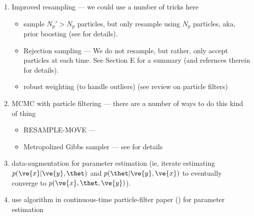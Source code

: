 \documentclass[12pt]{article}
\newcommand{\x}{\ve{x}}
\newcommand{\y}{\ve{y}}
\begin{document}
\begin{enumerate}
\item Improved resampling --- we could use a number of tricks here
\begin{itemize}
\item  sample $N_p' > N_p$ particles, but only resample using $N_p$ particles, aka, prior boosting (see \cite{Green95,CarpenterFearnhead99} for details).
\item  Rejection sampling --- We do not resample, but rather, only accept particles at each time. See \cite{Chen03} Section E for a summary  (and refernces therein for details). 
%
\item  robust weighting (to handle outliers) (see review on particle filters)
\end{itemize}  

\item MCMC with particle filtering --- there are a number of ways to do this kind of thing
\begin{itemize}
\item RESAMPLE-MOVE --- 
\item Metropolized Gibbs sampler --- see \cite{Liu96} for details
\end{itemize} 

\item data-augmentation for parameter estimation (ie, iterate estimating $p(\x | \y, \thet)$ and $p(\thet | \y, \x)$ to eventually converge to $p(\x, \thet, \y)$).
\item use algorithm in continuous-time particle-filter paper (\cite{NgDearden05}) for parameter estimation
\end{enumerate}
\end{document}
